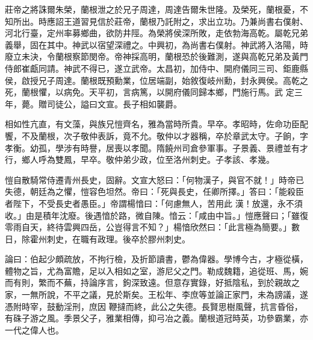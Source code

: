 \begin{pinyinscope}
 莊帝之將誅爾朱榮，蘭根泄之於兄子周達，周達告爾朱世隆。及榮死，蘭根憂，不
 知所出。時應詔王道習見信於莊帝，蘭根乃託附之，求出立功。乃兼尚書右僕射、河北行臺，定州率募鄉曲，欲防井陘。為榮將侯深所敗，走依勃海高乾。屬乾兄弟義舉，固在其中。神武以宿望深禮之。中興初，為尚書右僕射。神武將入洛陽，時廢立未決，令蘭根察節閔帝。帝神採高明，蘭根恐於後難測，遂與高乾兄弟及黃門侍郎崔甗同請。神武不得已，遂立武帝。太昌初，加侍中、開府儀同三司、鉅鹿縣侯，啟授兄子周達。蘭根既預勳業，位居端副，始敘復岐州勳，封永興侯。高乾之死，蘭根懼，以病免。天平初，言病篤，以開府儀同歸本鄉，門施行馬。武
 定三年，薨。贈司徒公，謚曰文宣。長子相如襲爵。



 相如性亢直，有文藻，與族兄愷齊名，雅為當時所貴。早卒。孝昭時，佐命功臣配饗，不及蘭根，次子敬仲表訴，竟不允。敬仲以才器稱，卒於章武太守。子餉，字孝衡。幼孤，學涉有時譽，居喪以孝聞。隋饒州司倉參軍事。子景義、景禮並有才行，鄉人呼為雙鳳，早卒。敬仲弟少政，位至洛州刺史。子孝該、孝幾。



 愷自散騎常侍遷青州長史，固辭。文宣大怒曰：「何物漢子，與官不就！」時帝已失德，朝廷為之懼，愷容色坦然。帝曰：「死與長史，任卿所擇。」答曰：「能殺臣者陛下，不受長史者愚臣。」帝謂楊愔曰：「何慮無人，苦用此
 漢！放還，永不須收。」由是積年沈廢。後遇愔於路，微自陳。愔云：「咸由中旨。」愷應聲曰；「雖復零雨自天，終待雲興四岳，公豈得言不知？」楊愔欣然曰：「此言極為簡要。」數日，除霍州刺史，在職有政理。後卒於膠州刺史。



 論曰：伯起少頗疏放，不拘行檢，及折節讀書，鬱為偉器。學博今古，才極從橫，體物之旨，尤為富贍，足以入相如之室，游尼父之門。勒成魏籍，追從班、馬，婉而有則，繁而不蕪，持論序言，鉤深致遠。但意存實錄，好抵陰私，到於親故之家，一無所說，不平之議，見於斯矣。王松年、李庶等並論正家門，未為謗議，遂憑附時宰，鼓動淫刑，庶因
 鞭撻而終，此公之失德。長賢思樹風聲，抗言昏俗，有硃子游之風。季景父子，雅業相傳，抑弓冶之義。蘭根道冠時英，功參霸業，亦一代之偉人也。



\end{pinyinscope}
